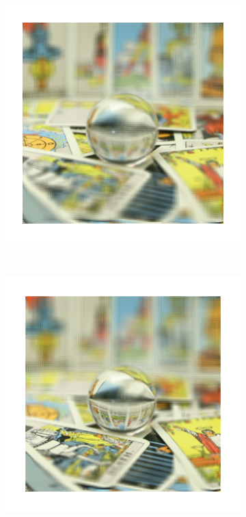 \documentclass[11pt,a4paper,titlepage]{article}
\begin{document}
\begin{figure}
\begin{subfigure}[t]{0.19\textwidth}
	\end{subfigure}%
	~
	\begin{subfigure}[t]{0.19\textwidth}
		\includegraphics[width=\textwidth]{results/tarot_back_projection/sensorPlaneZ=-0.5/Back_Projection_layer_3.png} 
	\end{subfigure}%
	~
	\begin{subfigure}[t]{0.19\textwidth}
		\includegraphics[width=\textwidth]{results/tarot_back_projection/sensorPlaneZ=-0.5/Back_Projection_layer_4.png} 

\end{subfigure}
\end{figure}
\end{document}
